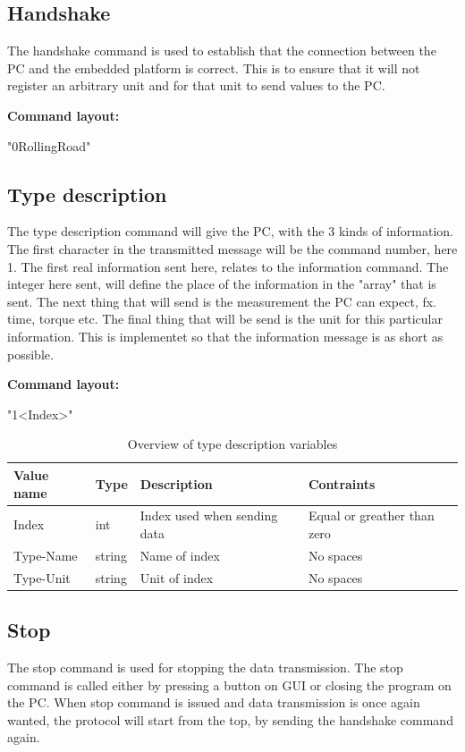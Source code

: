\subsection{Handshake}
The handshake command is used to establish that the connection between the PC and the embedded platform is correct. This is to ensure that it will not register an arbitrary unit and for that unit to send values to the PC.  

\textbf{Command layout:}

"0\textvisiblespace RollingRoad"

\subsection{Type description}
The type description command will give the PC, with the 3 kinds of information. The first character in the transmitted message will be the command number, here 1. The first real information sent here, relates to the information command. The integer here sent, will define the place of the information in the "array" that is sent. The next thing that will send is the measurement the PC can expect, fx. time, torque etc. The final thing that will be send is the unit for this particular information. This is implementet so that the information message is as short as possible.

\textbf{Command layout:}

"1\textvisiblespace <Index>"

\begin{table}[h!]
	\centering
	\label{Protocol:SP4RR_TypeDescVars}
	\begin{tabular}{llll}
		Value name 	& Type 		& Description 					& Contraints  					\\\hline
		Index  		& int   	& Index used when sending data 	& Equal or greather than zero	\\
		Type-Name  	& string 	& Name of index 				& No spaces						\\
		Type-Unit  	& string	& Unit of index					& No spaces 					\\
	\end{tabular}
	\caption{Overview of type description variables}
\end{table}

\subsection{Stop}
The stop command is used for stopping the data transmission. The stop command is called either by pressing a button on GUI or closing the program on the PC.
When stop command is issued and data transmission is once again wanted, the protocol will start from the top, by sending the handshake command again. 

